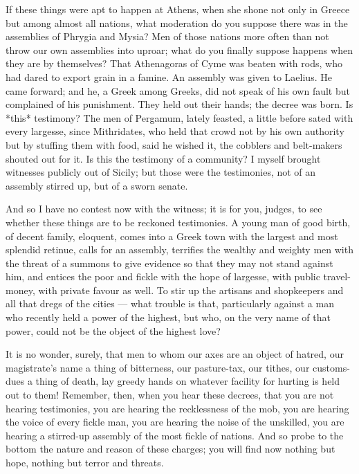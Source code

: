  If these things were apt to happen at Athens, when she shone not only in Greece but among almost all nations, what moderation do you suppose there was in the assemblies of Phrygia and Mysia? Men of those nations more often than not throw our own assemblies into uproar; what do you finally suppose happens when they are by themselves? That Athenagoras of Cyme was beaten with rods, who had dared to export grain in a famine. An assembly was given to Laelius. He came forward; and he, a Greek among Greeks, did not speak of his own fault but complained of his punishment. They held out their hands; the decree was born. Is *this* testimony? The men of Pergamum, lately feasted, a little before sated with every largesse, since Mithridates, who held that crowd not by his own authority but by stuffing them with food, said he wished it, the cobblers and belt-makers shouted out for it. Is this the testimony of a community? I myself brought witnesses publicly out of Sicily; but those were the testimonies, not of an assembly stirred up, but of a sworn senate.

 And so I have no contest now with the witness; it is for you, judges, to see whether these things are to be reckoned testimonies. A young man of good birth, of decent family, eloquent, comes into a Greek town with the largest and most splendid retinue, calls for an assembly, terrifies the wealthy and weighty men with the threat of a summons to give evidence so that they may not stand against him, and entices the poor and fickle with the hope of largesse, with public travel-money, with private favour as well. To stir up the artisans and shopkeepers and all that dregs of the cities --- what trouble is that, particularly against a man who recently held a power of the highest, but who, on the very name of that power, could not be the object of the highest love?

 It is no wonder, surely, that men to whom our axes are an object of hatred, our magistrate's name a thing of bitterness, our pasture-tax, our tithes, our customs-dues a thing of death, lay greedy hands on whatever facility for hurting is held out to them! Remember, then, when you hear these decrees, that you are not hearing testimonies, you are hearing the recklessness of the mob, you are hearing the voice of every fickle man, you are hearing the noise of the unskilled, you are hearing a stirred-up assembly of the most fickle of nations. And so probe to the bottom the nature and reason of these charges; you will find now nothing but hope, nothing but terror and threats.


